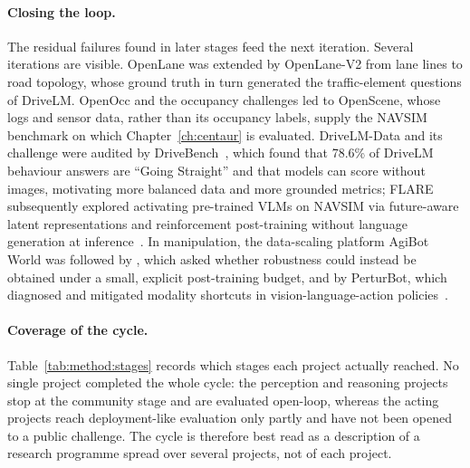 \paragraph{Closing the loop.} The residual failures found in later stages feed the next iteration. Several iterations are visible. OpenLane was extended by OpenLane-V2 from lane lines to road topology, whose ground truth in turn generated the traffic-element questions of DriveLM. OpenOcc and the occupancy challenges led to OpenScene, whose logs and sensor data, rather than its occupancy labels, supply the NAVSIM benchmark on which Chapter~\ref{ch:centaur} is evaluated. DriveLM-Data and its challenge were audited by DriveBench~\cite{xie2025vlms}, which found that 78.6\% of DriveLM behaviour answers are ``Going Straight'' and that models can score without images, motivating more balanced data and more grounded metrics; FLARE subsequently explored activating pre-trained VLMs on NAVSIM via future-aware latent representations and reinforcement post-training without language generation at inference~\cite{xie2026flare}. In manipulation, the data-scaling platform AgiBot World was followed by \chiz, which asked whether robustness could instead be obtained under a small, explicit post-training budget, and by PerturBot, which diagnosed and mitigated modality shortcuts in vision-language-action policies~\cite{liu2026perturbot}.

\paragraph{Coverage of the cycle.} Table~\ref{tab:method:stages} records which stages each project actually reached. No single project completed the whole cycle: the perception and reasoning projects stop at the community stage and are evaluated open-loop, whereas the acting projects reach deployment-like evaluation only partly and have not been opened to a public challenge. The cycle is therefore best read as a description of a research programme spread over several projects, not of each project.

